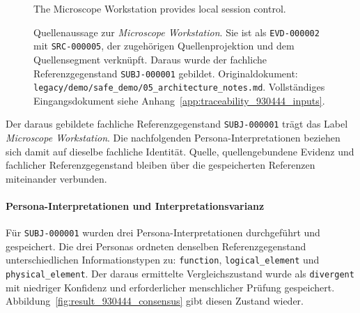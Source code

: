 \begin{figure}[htbp]
    \centering
    \begin{minipage}{0.94\textwidth}
        \begin{evidencebox}
The Microscope Workstation provides local session control.
        \end{evidencebox}
    \end{minipage}
    \caption[Quellenaussage zur Microscope Workstation]{
        Quellenaussage zur \emph{Microscope Workstation}. Sie ist als
        \texttt{EVD-000002} mit \texttt{SRC-000005}, der zugehörigen
        Quellenprojektion und dem Quellensegment verknüpft. Daraus wurde der
        fachliche Referenzgegenstand \texttt{SUBJ-000001} gebildet.
        Originaldokument:
        \texttt{legacy/demo/safe\_demo/05\_architecture\_notes.md}.
        Vollständiges Eingangsdokument siehe
        Anhang~\ref{app:traceability_930444_inputs}.}
    \label{fig:result_930444_source}
\end{figure}

Der daraus gebildete fachliche Referenzgegenstand
\texttt{SUBJ-000001} trägt das Label \emph{Microscope Workstation}.
Die nachfolgenden Persona-Interpretationen beziehen sich damit auf dieselbe
fachliche Identität. Quelle, quellengebundene Evidenz und fachlicher
Referenzgegenstand bleiben über die gespeicherten Referenzen miteinander
verbunden.

\paragraph{Persona-Interpretationen und Interpretationsvarianz}

Für \texttt{SUBJ-000001} wurden drei Persona-Interpretationen durchgeführt
und gespeichert. Die drei Personas ordneten denselben Referenzgegenstand
unterschiedlichen Informationstypen zu: \texttt{function},
\texttt{logical\_element} und \texttt{physical\_element}. Der daraus
ermittelte Vergleichszustand wurde als \texttt{divergent} mit niedriger
Konfidenz und erforderlicher menschlicher Prüfung gespeichert.
Abbildung~\ref{fig:result_930444_consensus} gibt diesen Zustand wieder.

